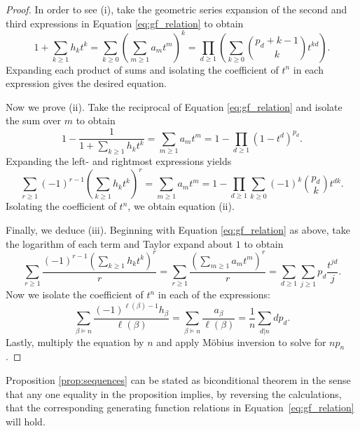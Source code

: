 \documentclass[11pt]{amsart}
\theoremstyle{definition}
\newtheorem{remark}[theorem]{Remark}
\numberwithin{equation}{section}
\begin{document}
\begin{proof}

In order to see (i), take the geometric series expansion of the second and third expressions in Equation \eqref{eq:gf_relation} to obtain
\begin{equation}\label{eq:gf_relation_reciprocal}
1 + \sum_{k \geq 1} h_k t^k
= \sum_{k \geq 0} \left(\sum_{m \geq 1} a_m t^m\right)^k
= \prod_{d \geq 1} \left(\sum_{k \geq 0} \binom{p_d+k-1}{k} t^{kd}\right).
\end{equation}
Expanding each product of sums and isolating the coefficient of $t^{n}$ in each expression gives the desired equation.

Now we prove (ii).  Take the reciprocal of Equation \eqref{eq:gf_relation}
and isolate the sum over $m$ to obtain
\[
1 - \frac{1}{1 + \sum_{k \geq 1} h_k t^k} 
= \sum_{m \geq 1} a_m t^m 
= 1 - \prod_{d \geq 1} (1-t^d)^{p_d}.
\]
Expanding the left- and rightmost expressions yields
\[
\sum_{r \geq 1} (-1)^{r-1} \left(\sum_{k \geq 1} h_k t^k\right)^r
= \sum_{m \geq 1} a_m t^m
= 1 - \prod_{d \geq 1} \sum_{k \geq 0} (-1)^k \binom{p_d}{k} t^{dk}.
\]
Isolating the coefficient of $t^{n}$, we obtain equation (ii).

Finally, we deduce (iii).  Beginning with Equation \eqref{eq:gf_relation} as above,
take the logarithm of each term and Taylor expand about $1$ to obtain
%
\[
 \sum_{r \geq 1} \frac{(-1)^{r-1}(\sum_{k \geq 1} h_k t^k )^r}{r}
= \sum_{r \geq 1} \frac{(\sum_{m \geq 1} a_m t^m )^r}{r}
= \sum_{d \geq 1} \sum_{j \geq 1} p_d \frac{t^{jd}}{j}.
\]
Now we isolate the coefficient of $t^{n}$ in each of the expressions: 
\[
\sum_{\beta \vDash n} \frac{(-1)^{\ell(\beta)-1} h_\beta}{\ell(\beta)}
= \sum_{\beta \vDash n} \frac{a_\beta}{\ell(\beta)}
= \frac{1}{n} \sum_{d | n} d p_{d} .
\]
Lastly, multiply the equation by $n$ and apply M\"{o}bius inversion to solve for $n p_{n}$.
\end{proof}

Proposition \ref{prop:sequences} can be stated as biconditional theorem in the sense
that any one equality in the proposition implies, by reversing the calculations,
that the corresponding generating function relations in Equation~\eqref{eq:gf_relation}
will hold.
\end{document}
